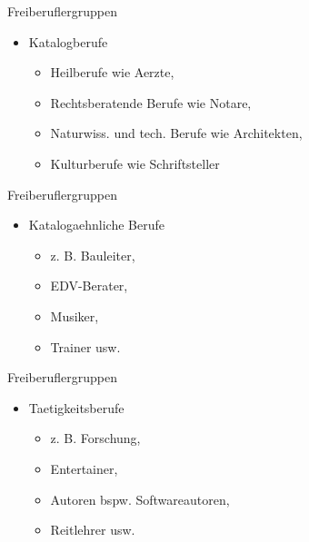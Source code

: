 
\begin{frame}{Freiberuflergruppen}
  \begin{itemize}
  \item Katalogberufe
    \begin{itemize}
    \item Heilberufe wie Aerzte,
    \item Rechtsberatende Berufe wie Notare,
    \item Naturwiss. und tech. Berufe wie Architekten,
    \item Kulturberufe wie Schriftsteller
    \end{itemize}
  \end{itemize}
\end{frame}

\begin{frame}{Freiberuflergruppen}
  \begin{itemize}
  \item Katalogaehnliche Berufe
    \begin{itemize}
    \item z. B. Bauleiter,
    \item EDV-Berater,
    \item Musiker,
    \item Trainer usw.
    \end{itemize}
  \end{itemize}
\end{frame}
    
\begin{frame}{Freiberuflergruppen}
  \begin{itemize}
  \item Taetigkeitsberufe
    \begin{itemize}
    \item z. B. Forschung,
    \item Entertainer,
    \item Autoren bspw. Softwareautoren,
    \item Reitlehrer usw.
    \end{itemize}
  \end{itemize}
\end{frame}
